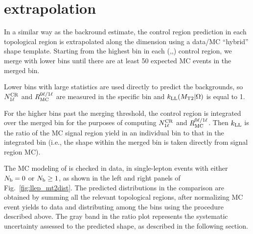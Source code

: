 \section{\texorpdfstring{\mttwo}{MT2} extrapolation}
\label{sec:llep_mt2}

In a similar way as the \znunu backround estimate, the control region prediction in each topological region is
extrapolated along the \mttwo dimension using a data/MC ``hybrid'' shape template.
Starting from the highest \mttwo bin in each (\Ht,\Nj,\Nb) control region, we merge with lower bins until
there are at least 50 expected MC events in the merged bin. 

Lower \mttwo bins with large statistics are used directly
to predict the backgrounds, so $N_{\mathrm{1\ell}}^{\mathrm{CR}}$ and $R_{\mathrm{MC}}^{0\ell/1\ell}$ are measured in the specific
\mttwo bin and $k_{\mathrm{LL}}(M_{\mathrm{T2}}|\Omega)$ is equal to 1.

For the higher \mttwo bins past the merging threshold, the control region is integrated over the merged bin
for the purposes of computing $N_{\mathrm{1\ell}}^{\mathrm{CR}}$ and $R_{\mathrm{MC}}^{0\ell/1\ell}$. Then $k_{\mathrm{LL}}$ is the 
ratio of the MC signal region yield in an individual \mttwo bin to that in the integrated bin (i.e., the \mttwo
shape within the merged bin is taken directly from signal region MC).

The MC modeling of \mttwo is checked in data, in single-lepton events with either $N_{\mathrm{b}}=0$ or $N_{\mathrm{b}}\geq1$, as
shown in the left and right panels of Fig.~\ref{fig:llep_mt2dist}. The predicted distributions in the comparison
are obtained by summing all the relevant topological regions, after normalizing MC event yields to data
and distributing among the \mttwo bins using the procedure described above. The gray band in the ratio plot represents the
systematic uncertainty assessed to the predicted \mttwo shape, as described in the following section.

